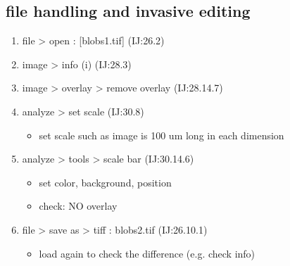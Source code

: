 \documentclass[11pt]{article}
\begin{document}
\subsection{file handling and invasive editing}
\label{sec-1-5}
\begin{enumerate}
\item file > open : [blobs1.tif] (IJ:26.2)
\item image > info (i) (IJ:28.3)
\item image > overlay > remove overlay (IJ:28.14.7)
\item analyze > set scale  (IJ:30.8)
\begin{itemize}
\item set scale such as image is 100 um long in each dimension
\end{itemize}
\item analyze > tools > scale bar (IJ:30.14.6)
\begin{itemize}
\item set color, background, position
\item check: NO overlay
\end{itemize}
\item file > save as > tiff : blobs2.tif (IJ:26.10.1)
\begin{itemize}
\item load again to check the difference (e.g. check info)
\end{itemize}
\end{enumerate}
\end{document}
